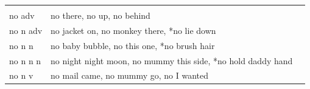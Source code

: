 \documentclass[man]{apa6}
\begin{document}
\begin{longtable}[]{@{}lll@{}}
\begin{minipage}[t]{0.27\columnwidth}
\strut
\end{minipage}\tabularnewline
\begin{minipage}[t]{0.21\columnwidth}\raggedright\strut
no adv\strut
\end{minipage} & \begin{minipage}[t]{0.43\columnwidth}\raggedright\strut
no there, no up, no behind\strut
\end{minipage} & \begin{minipage}[t]{0.27\columnwidth}\raggedright\strut
\strut
\end{minipage}\tabularnewline
\begin{minipage}[t]{0.21\columnwidth}\raggedright\strut
no n adv\strut
\end{minipage} & \begin{minipage}[t]{0.43\columnwidth}\raggedright\strut
no jacket on, no monkey there, *no lie down\strut
\end{minipage} & \begin{minipage}[t]{0.27\columnwidth}\raggedright\strut
\strut
\end{minipage}\tabularnewline
\begin{minipage}[t]{0.21\columnwidth}\raggedright\strut
no n n\strut
\end{minipage} & \begin{minipage}[t]{0.43\columnwidth}\raggedright\strut
no baby bubble, no this one, *no brush hair\strut
\end{minipage} & \begin{minipage}[t]{0.27\columnwidth}\raggedright\strut
\strut
\end{minipage}\tabularnewline
\begin{minipage}[t]{0.21\columnwidth}\raggedright\strut
no n n n\strut
\end{minipage} & \begin{minipage}[t]{0.43\columnwidth}\raggedright\strut
no night night moon, no mummy this side, *no hold daddy hand\strut
\end{minipage} & \begin{minipage}[t]{0.27\columnwidth}\raggedright\strut
\strut
\end{minipage}\tabularnewline
\begin{minipage}[t]{0.21\columnwidth}\raggedright\strut
no n v\strut
\end{minipage} & \begin{minipage}[t]{0.43\columnwidth}\raggedright\strut
no mail came, no mummy go, no I wanted\strut
\end{minipage} & \begin{minipage}[t]{0.27\columnwidth}\raggedright\strut

\end{minipage}
\end{longtable}
\end{document}
